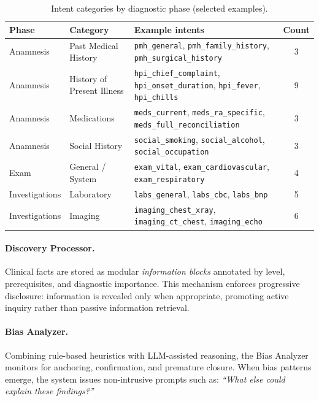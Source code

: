 \begin{table}[h]
\centering
\caption{Intent categories by diagnostic phase (selected examples).}
\label{tab:intent_taxonomy}
\setlength{\tabcolsep}{6pt}
\renewcommand{\arraystretch}{1.15}
\begin{tabular}{p{2.5cm} p{3.2cm} p{6.7cm} c}
\toprule
\textbf{Phase} & \textbf{Category} & \textbf{Example intents} & \textbf{Count} \\
\midrule
Anamnesis & Past Medical History &
\texttt{pmh\_general}, \texttt{pmh\_family\_history}, \texttt{pmh\_surgical\_history} & 3 \\
Anamnesis & History of Present Illness &
\texttt{hpi\_chief\_complaint}, \texttt{hpi\_onset\_duration}, \texttt{hpi\_fever}, \texttt{hpi\_chills} & 9 \\
Anamnesis & Medications &
\texttt{meds\_current}, \texttt{meds\_ra\_specific}, \texttt{meds\_full\_reconciliation} & 3 \\
Anamnesis & Social History &
\texttt{social\_smoking}, \texttt{social\_alcohol}, \texttt{social\_occupation} & 3 \\
Exam & General / System &
\texttt{exam\_vital}, \texttt{exam\_cardiovascular}, \texttt{exam\_respiratory} & 4 \\
Investigations & Laboratory &
\texttt{labs\_general}, \texttt{labs\_cbc}, \texttt{labs\_bnp} & 5 \\
Investigations & Imaging &
\texttt{imaging\_chest\_xray}, \texttt{imaging\_ct\_chest}, \texttt{imaging\_echo} & 6 \\
\bottomrule
\end{tabular}
\end{table}

\paragraph{Discovery Processor.}
Clinical facts are stored as modular \textit{information blocks} annotated by
level, prerequisites, and diagnostic importance. This mechanism enforces
progressive disclosure: information is revealed only when appropriate, promoting
active inquiry rather than passive information retrieval.

\paragraph{Bias Analyzer.}
Combining rule-based heuristics with LLM-assisted reasoning, the Bias Analyzer
monitors for anchoring, confirmation, and premature closure. When bias patterns
emerge, the system issues non-intrusive prompts such as:
\emph{“What else could explain these findings?”}

